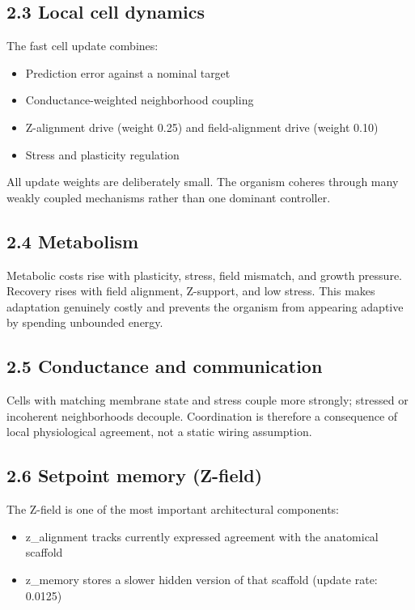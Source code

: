 \documentclass[11pt,a4paper]{article}
\begin{document}
\subsection{2.3 Local cell dynamics}
The fast cell update combines:
\begin{itemize}[leftmargin=*,itemsep=3pt]
\item Prediction error against a nominal target
\item Conductance-weighted neighborhood coupling
\item Z-alignment drive (weight 0.25) and field-alignment drive (weight 0.10)
\item Stress and plasticity regulation
\end{itemize}

All update weights are deliberately small. The organism coheres through many weakly coupled mechanisms rather than one dominant controller.

\subsection{2.4 Metabolism}
Metabolic costs rise with plasticity, stress, field mismatch, and growth pressure. Recovery rises with field alignment, Z-support, and low stress. This makes adaptation genuinely costly and prevents the organism from appearing adaptive by spending unbounded energy.

\subsection{2.5 Conductance and communication}
Cells with matching membrane state and stress couple more strongly; stressed or incoherent neighborhoods decouple. Coordination is therefore a consequence of local physiological agreement, not a static wiring assumption.

\subsection{2.6 Setpoint memory (Z-field)}
The Z-field is one of the most important architectural components:
\begin{itemize}[leftmargin=*,itemsep=3pt]
\item z\_alignment tracks currently expressed agreement with the anatomical scaffold
\item z\_memory stores a slower hidden version of that scaffold (update rate: 0.0125)
\end{itemize}
\end{document}
